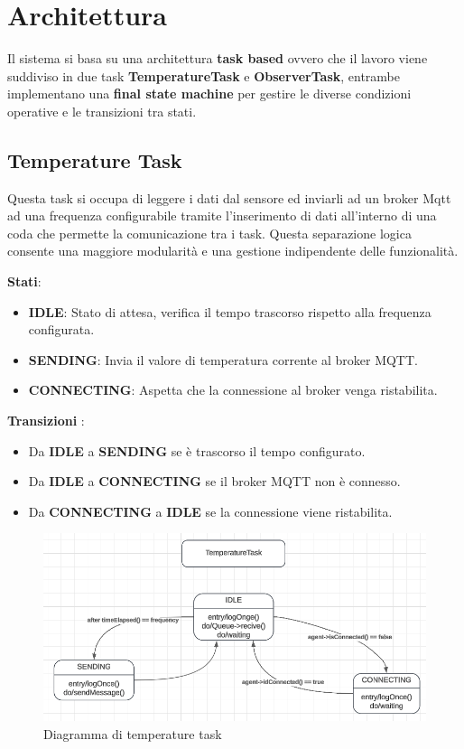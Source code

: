 \documentclass{report}
\begin{document}
\section{Architettura}

\par{
    Il sistema si basa su una architettura \textbf{task based} ovvero che il lavoro viene suddiviso in due task \textbf{TemperatureTask} e \textbf{ObserverTask}, entrambe implementano una \textbf{final state machine} per gestire le diverse condizioni operative e le transizioni tra stati. 
}
\subsection{Temperature Task}

\par{
    Questa task si occupa di leggere i dati dal sensore ed inviarli ad un broker Mqtt ad una frequenza configurabile tramite l'inserimento di dati all'interno di una coda che permette la comunicazione tra i task. Questa separazione logica consente una maggiore modularità e una gestione indipendente delle funzionalità.\newline
}
\par{\textbf{Stati}:}
\begin{itemize}
    \item \textbf{IDLE}: Stato di attesa, verifica il tempo trascorso rispetto alla frequenza configurata.
    \item \textbf{SENDING}: Invia il valore di temperatura corrente al broker MQTT.
    \item \textbf{CONNECTING}: Aspetta che la connessione al broker venga ristabilita.
\end{itemize}
\par{
    \textbf{Transizioni} :
}
\begin{itemize}
    \item Da \textbf{IDLE} a \textbf{SENDING} se è trascorso il tempo configurato.
    \item Da \textbf{IDLE} a \textbf{CONNECTING} se il broker MQTT non è connesso.
    \item Da \textbf{CONNECTING} a \textbf{IDLE} se la connessione viene ristabilita.
\end{itemize}


\begin{figure}[!h]
    \centering
    \includegraphics[width=0.8\linewidth]{img/assignment-03/temperatureTask.png}
    \caption{Diagramma di temperature task}
    \label{fig:stati}
\end{figure}
\end{document}
